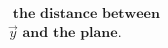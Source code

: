 \documentclass[preview]{standalone}
\begin{document}
\begin{align*}
\,\, \textbf{the distance between} \\ \vec{y} \,\, \textbf{and the plane.}
\end{align*}
\end{document}
